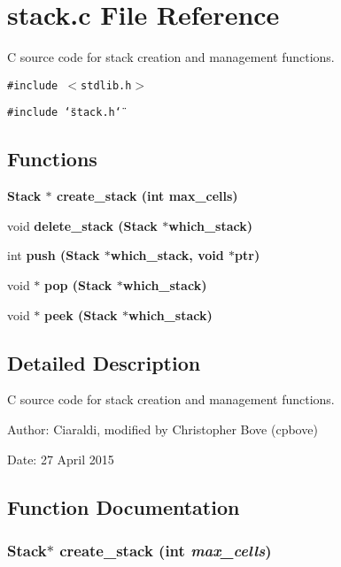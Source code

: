 \section{stack.c File Reference}
\label{stack_8c}
C source code for stack creation and management functions. 

{\tt \#include $<$stdlib.h$>$}\par
{\tt \#include \char`\"{}stack.h\char`\"{}}\par
\subsection*{Functions}
\begin{CompactItemize}
\item 
\bf{Stack} $\ast$ \bf{create\_\-stack} (int max\_\-cells)
\item 
void \bf{delete\_\-stack} (\bf{Stack} $\ast$which\_\-stack)
\item 
int \bf{push} (\bf{Stack} $\ast$which\_\-stack, void $\ast$ptr)
\item 
void $\ast$ \bf{pop} (\bf{Stack} $\ast$which\_\-stack)
\item 
void $\ast$ \bf{peek} (\bf{Stack} $\ast$which\_\-stack)
\end{CompactItemize}


\subsection{Detailed Description}
C source code for stack creation and management functions. 

\begin{Desc}
\item[Author:]Ciaraldi, modified by Christopher Bove (cpbove) \end{Desc}
\begin{Desc}
\item[Date:]27 April 2015 \end{Desc}


\subsection{Function Documentation}
\subsubsection{\setlength{\rightskip}{0pt plus 5cm}\bf{Stack}$\ast$ create\_\-stack (int {\em max\_\-cells})}\label{stack_8c_95307d53d00d64c88d94459933faab55}



